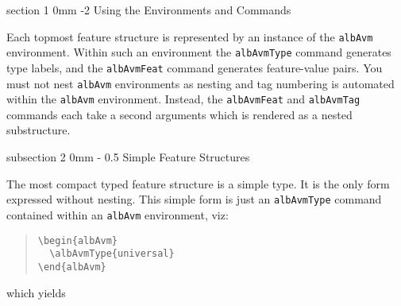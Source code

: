 \documentclass[11pt,a4paper,oneside]{article}
\makeatletter
\renewcommand{\section}{\@startsection%
  {section}%
  {1}%
  {0mm}%
  {-2\baselineskip}%
  {\baselineskip}%
  {\normalfont\sffamily\bfseries\Large}%
  }
\renewcommand{\subsection}{\@startsection%
  {subsection}%
  {2}%
  {0mm}%
  {-\baselineskip}%
  {0.5\baselineskip}%
  {\normalfont\sffamily\bfseries\large}%
  }
\makeatother
\begin{document}

\section{Using the Environments and Commands}
\label{sec:avm-examples:using-envir-comm}

Each topmost feature structure is represented by an instance of the
\texttt{albAvm} environment.  Within such an environment the
\texttt{albAvmType} command generates type labels, and the
\texttt{albAvmFeat} command generates feature-value pairs.  You must not
nest \texttt{albAvm} environments as nesting and tag numbering is
automated within the \texttt{albAvm} environment.  Instead, the
\texttt{albAvmFeat} and \texttt{albAvmTag} commands each take a second
arguments which is rendered as a nested substructure.


\subsection{Simple Feature Structures}
\label{sec:avm-examples:simple-feat-struct}

The most compact typed feature structure is a simple type.  It is the
only form expressed without nesting.  This simple form is just an
\texttt{albAvmType} command contained within an \texttt{albAvm}
environment, viz:
\begin{quote}
\begin{verbatim}
\begin{albAvm}
  \albAvmType{universal}
\end{albAvm}
\end{verbatim}
\end{quote}
which yields
\begin{quote}
  \begin{albAvm}
  \end{albAvm}
\end{quote}
\end{document}
